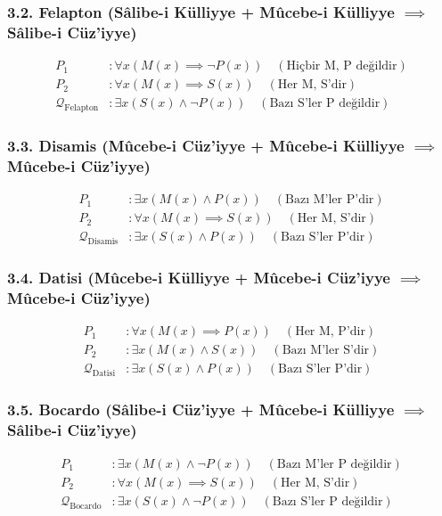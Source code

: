 \documentclass[11pt, a4paper]{article}
\begin{document}
\subsubsection{3.2. Felapton (Sâlibe-i Külliyye + Mûcebe-i Külliyye $\implies$ Sâlibe-i Cüz'iyye)}
\begin{align}
P_1 &: \forall x (M(x) \implies \neg P(x)) \quad (\text{Hiçbir M, P değildir}) \\
P_2 &: \forall x (M(x) \implies S(x)) \quad (\text{Her M, S'dir}) \\
\mathcal{Q}_{\text{Felapton}} &: \exists x (S(x) \land \neg P(x)) \quad (\text{Bazı S'ler P değildir})
\end{align}

\subsubsection{3.3. Disamis (Mûcebe-i Cüz'iyye + Mûcebe-i Külliyye $\implies$ Mûcebe-i Cüz'iyye)}
\begin{align}
P_1 &: \exists x (M(x) \land P(x)) \quad (\text{Bazı M'ler P'dir}) \\
P_2 &: \forall x (M(x) \implies S(x)) \quad (\text{Her M, S'dir}) \\
\mathcal{Q}_{\text{Disamis}} &: \exists x (S(x) \land P(x)) \quad (\text{Bazı S'ler P'dir})
\end{align}

\subsubsection{3.4. Datisi (Mûcebe-i Külliyye + Mûcebe-i Cüz'iyye $\implies$ Mûcebe-i Cüz'iyye)}
\begin{align}
P_1 &: \forall x (M(x) \implies P(x)) \quad (\text{Her M, P'dir}) \\
P_2 &: \exists x (M(x) \land S(x)) \quad (\text{Bazı M'ler S'dir}) \\
\mathcal{Q}_{\text{Datisi}} &: \exists x (S(x) \land P(x)) \quad (\text{Bazı S'ler P'dir})
\end{align}

\subsubsection{3.5. Bocardo (Sâlibe-i Cüz'iyye + Mûcebe-i Külliyye $\implies$ Sâlibe-i Cüz'iyye)}
\begin{align}
P_1 &: \exists x (M(x) \land \neg P(x)) \quad (\text{Bazı M'ler P değildir}) \\
P_2 &: \forall x (M(x) \implies S(x)) \quad (\text{Her M, S'dir}) \\
\mathcal{Q}_{\text{Bocardo}} &: \exists x (S(x) \land \neg P(x)) \quad (\text{Bazı S'ler P değildir})
\end{align}
\end{document}
